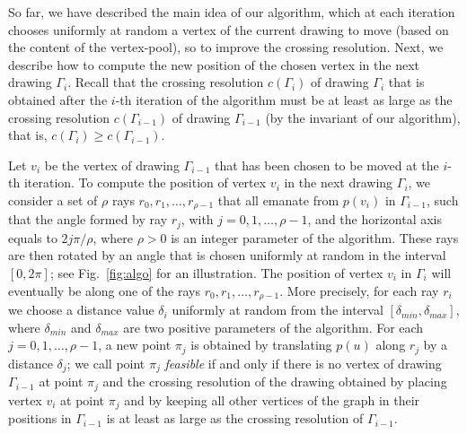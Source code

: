 \documentclass{comjnl}
\begin{document}
So far, we have described the main idea of our algorithm, which at each iteration chooses uniformly at random a vertex of the current drawing to move (based on the content of the vertex-pool), so to improve the crossing resolution. Next, we describe how to compute the new position of the chosen vertex in the next drawing $\Gamma_i$. Recall that the crossing resolution $c(\Gamma_{i})$ of drawing $\Gamma_{i}$ that is obtained after the $i$-th iteration of the algorithm must be at least as large as the crossing resolution $c(\Gamma_{i-1})$ of drawing $\Gamma_{i-1}$ (by the invariant of our algorithm), that is, $c(\Gamma_i) \ge c(\Gamma_{i-1})$. 

Let $v_i$ be the vertex of drawing $\Gamma_{i-1}$ that has been chosen to be moved at the $i$-th iteration. To compute the position of vertex $v_i$ in the next drawing $\Gamma_i$, we consider a set of $\rho$ rays $r_0,r_1,\ldots,r_{\rho-1}$ that all emanate from $p(v_i)$ in $\Gamma_{i-1}$, such that the angle formed by ray $r_j$, with $j=0,1,\ldots,\rho-1$, and the horizontal axis equals to $2j\pi/\rho$, where $\rho>0$ is an integer parameter of the algorithm. These rays are then rotated by an angle that is chosen uniformly at random in the interval $[0,2\pi]$; see Fig.~\ref{fig:algo} for an illustration. The position of vertex $v_i$ in $\Gamma_i$ will eventually be along one of the rays $r_0,r_1,\ldots,r_{\rho-1}$. More precisely, for each ray $r_i$ we choose a distance value $\delta_i$ uniformly at random from the interval $[\delta_{min},\delta_{max}]$, where $\delta_{min}$ and $\delta_{max}$ are two positive parameters of the algorithm. For each $j=0,1,\ldots,\rho-1$, a new point $\pi_j$ is obtained by translating $p(u)$ along $r_j$ by a distance $\delta_j$; we call point $\pi_j$ \emph{feasible} if and only if there is no vertex of drawing $\Gamma_{i-1}$ at point $\pi_j$ and the crossing resolution of the drawing obtained by placing vertex $v_i$ at point $\pi_j$ and by keeping all other vertices of the graph in their positions in $\Gamma_{i-1}$ is at least as large as the crossing resolution of $\Gamma_{i-1}$.
\end{document}
